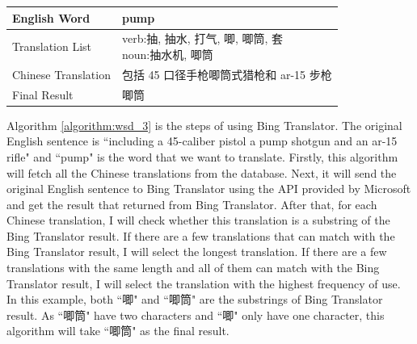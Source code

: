 \begin{CJK}{UTF8}{gbsn}
\begin{table}[ht]
\begin{center}
\begin{tabular}{| p{2.5cm} | p{4cm} |}
        \hline
        English Word & pump \\
        \hline
        Translation List & \parbox[t]{4cm}{verb:抽, 抽水, 打气, 唧, 唧筒, 套\\ noun:抽水机, 唧筒}\\
        \hline
        Chinese Translation & 包括 45 口径手枪唧筒式猎枪和 ar-15 步枪\\
        \hline
        Final Result & 唧筒\\
        \hline
    \end{tabular}
    \end{center}
\end{table}

Algorithm \ref{algorithm:wsd_3} is the steps of using Bing Translator. The original English sentence is ``including a 45-caliber pistol a pump shotgun and an ar-15 rifle" and ``pump" is the word that we want to translate. Firstly, this algorithm will fetch all the Chinese translations from the database. Next, it will send the original English sentence to Bing Translator using the API provided by Microsoft and get the result that returned from Bing Translator. After that, for each Chinese translation, I will check whether this translation is a substring of the Bing Translator result. If there are a few translations that can match with the Bing Translator result, I will select the longest translation. If there are a few translations with the same length and all of them can match with the Bing Translator result, I will select the translation with the highest frequency of use. In this example, both ``唧" and ``唧筒" are the substrings of Bing Translator result. As ``唧筒" have two characters and ``唧" only have one character, this algorithm will take ``唧筒" as the final result.



\end{CJK}

